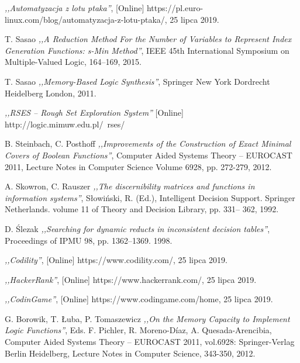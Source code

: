 \begin{thebibliography}{99}
 \emph{,,Automatyzacja z lotu ptaka''}, [Online] https://pl.euro-linux.com/blog/automatyzacja-z-lotu-ptaka/, 25 lipca 2019.

 T. Sasao \emph{,,A Reduction Method For the Number of Variables to Represent Index Generation Functions: s-Min Method''}, IEEE 45th International Symposium on Multiple-Valued Logic, 164–169, 2015.

 T. Sasao \emph{,,Memory-Based Logic Synthesis''}, Springer New York Dordrecht Heidelberg London, 2011.

 \emph{,,RSES – Rough Set Exploration System''} [Online] http://logic.mimuw.edu.pl/~rses/

 B. Steinbach, C. Posthoff \emph{,,Improvements of the Construction of Exact Minimal Covers of Boolean Functions''}, Computer Aided Systems Theory – EUROCAST 2011, Lecture Notes in Computer Science Volume 6928, pp. 272-279, 2012.

 A. Skowron, C. Rauszer \emph{,,The discernibility matrices and functions in information systems''}, Słowiński, R. (Ed.), Intelligent Decision Support. Springer Netherlands. volume 11 of Theory and Decision Library, pp. 331– 362, 1992.

 D. Ślezak \emph{,,Searching for dynamic reducts in inconsistent decision tables''}, Proceedings of IPMU 98, pp. 1362–1369. 1998.

 \emph{,,Codility''}, [Online] https://www.codility.com/, 25 lipca 2019.

 \emph{,,HackerRank''}, [Online] https://www.hackerrank.com/, 25 lipca 2019.

 \emph{,,CodinGame''}, [Online] https://www.codingame.com/home, 25 lipca 2019.

 G. Borowik, T. Łuba, P. Tomaszewicz \emph{,,On the Memory Capacity to Implement Logic Functions''}, Eds. F. Pichler, R. Moreno-Díaz, A. Quesada-Arencibia, Computer Aided Systems Theory – EUROCAST 2011, vol.6928: Springer-Verlag Berlin Heidelberg, Lecture Notes in Computer Science, 343-350, 2012.


\end{thebibliography}
